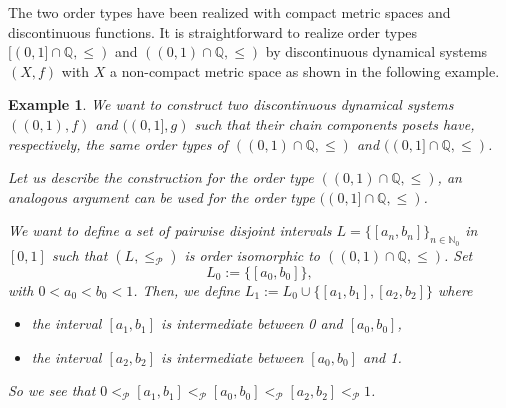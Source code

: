 \documentclass[pdflatex,sn-mathphys-num]{sn-jnl}
\theoremstyle{thmstyleone}%
\theoremstyle{thmstyletwo}%
\newtheorem{exa}{Example}%
\theoremstyle{thmstylethree}%
\begin{document}
\noindent The two order types have been realized with compact metric spaces and discontinuous functions.
It is straightforward to realize order types $[(0,1]\cap\mathbb{Q},\leq)$ and $((0,1)\cap\mathbb{Q},\leq)$ by discontinuous dynamical systems $(X,f)$ with $X$ a non-compact metric space as shown in the following example.

\begin{exa}
We want to construct two discontinuous dynamical systems $((0,1),f)$ and $((0,1],g)$ such that their chain components posets have, respectively, the same order types of $((0,1)\cap\mathbb{Q},\leq)$ and $((0,1]\cap\mathbb{Q},\leq)$.

\noindent Let us describe the construction for the order type $((0,1)\cap\mathbb{Q},\leq)$, an analogous argument can be used for the order type $((0,1]\cap\mathbb{Q},\leq)$. 

\noindent We want to define a set of pairwise disjoint intervals $L=\{[a_n,b_n]\}_{n\in\mathbb{N}_0}$ in $[0,1]$ such that $(L,\le_\mathcal{P})$ is order isomorphic to $((0,1)\cap\mathbb{Q},\leq)$. 
Set
$$
L_0:=\{[a_0,b_0]\},
$$
with $0<a_0<b_0<1$. Then, we define $L_1:=L_0\cup \{[a_1,b_1],[a_2,b_2]\}$ where
\begin{itemize}
    \item the interval $[a_1,b_1]$ is intermediate between 0 and $[a_0,b_0]$,
    \item the interval $[a_2,b_2]$ is intermediate between $[a_0,b_0]$ and 1. 
\end{itemize}
So we see that $0<_\mathcal{P} [a_1,b_1] <_\mathcal{P} [a_0,b_0] <_\mathcal{P} [a_2,b_2] <_\mathcal{P} 1$.


\end{exa}
\end{document}
